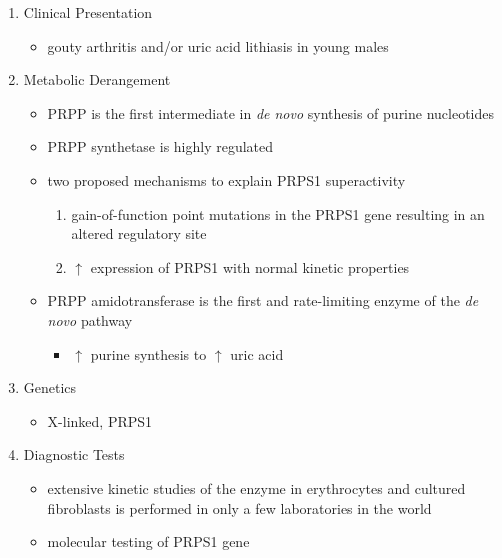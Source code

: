 \documentclass{scrartcl}
\begin{document}
\begin{enumerate}
\item Clinical Presentation
\label{sec:org36ad52a}
\begin{itemize}
\item gouty arthritis and/or uric acid lithiasis in young males
\end{itemize}

\item Metabolic Derangement
\label{sec:orgdafa324}
\begin{itemize}
\item PRPP is the first intermediate in \emph{de novo} synthesis of purine nucleotides
\end{itemize}
\begin{itemize}
\item PRPP synthetase is highly regulated
\item two proposed mechanisms to explain PRPS1 superactivity
\begin{enumerate}
\item gain-of-function point mutations in the PRPS1 gene resulting in an
altered regulatory site
\item \(\uparrow\) expression of PRPS1 with normal kinetic properties
\end{enumerate}
\item PRPP amidotransferase is the first and rate-limiting enzyme of the
\emph{de novo} pathway
\begin{itemize}
\item \(\uparrow\) purine synthesis to \(\uparrow\) uric acid
\end{itemize}
\end{itemize}

\item Genetics
\label{sec:org399ac54}
\begin{itemize}
\item X-linked, PRPS1
\end{itemize}

\item Diagnostic Tests
\label{sec:org42d1745}
\begin{itemize}
\item extensive kinetic studies of the enzyme in erythrocytes and cultured
fibroblasts is performed in only a few laboratories in the world
\item molecular testing of PRPS1 gene
\end{itemize}


\end{enumerate}
\end{document}
